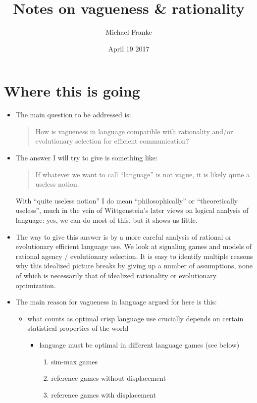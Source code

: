 \documentclass[fleqn,reqno,10pt]{article}
\title{Notes on vagueness \& rationality}
\author{Michael Franke}
\date{April 19 2017}
\begin{document}
\maketitle

\section*{Where this is going}

\begin{itemize}
\item The main question to be addressed is:
  \begin{quote}
    How is vagueness in language compatible with rationality and/or evolutionary selection for
    efficient communication?
  \end{quote}
\item The answer I will try to give is something like:
  \begin{quote}
    If whatever we want to call ``language'' is not vague, it is likely quite a useless notion.
  \end{quote}
  With ``quite useless notion'' I do mean ``philosophically'' or ``theoretically useless'', much in
  the vein of Wittgenstein's later views on logical analysis of language: yes, we can do most
  of this, but it shows us little.
\item The way to give this answer is by a more careful analysis of rational or evolutionary
  efficient language use. We look at signaling games and models of rational agency /
  evolutionary selection. It is easy to identify multiple reasons why this idealized picture
  breaks by giving up a number of assumptions, none of which is necessarily that of idealized
  rationality or evolutionary optimization.
\item The main reason for vagueness in language argued for here is this:
  \begin{itemize}
  \item what counts as optimal crisp language use crucially depends on certain
    statistical properties of the world
    \begin{itemize}
    \item language must be optimal in different language games (see below)
      \begin{enumerate}
      \item sim-max games
      \item reference games without displacement
      \item reference games with displacement

\end{enumerate}
\end{itemize}
\end{itemize}
\end{itemize}
\end{document}
